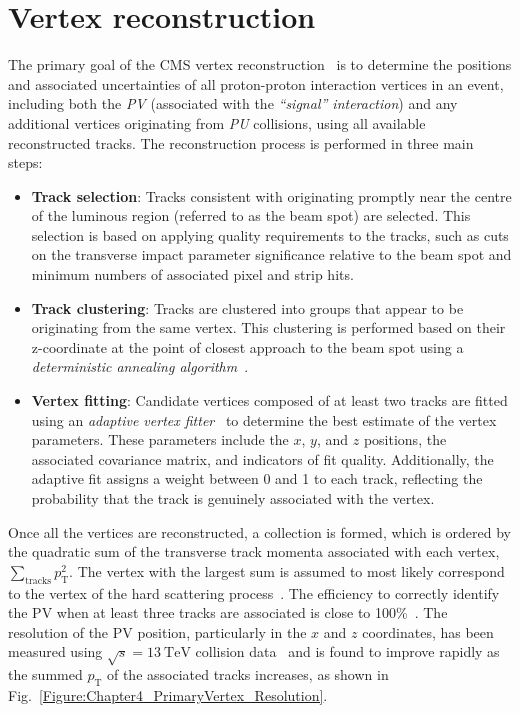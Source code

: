 \section{Vertex reconstruction}

The primary goal of the CMS vertex reconstruction~\cite{CMS_TrackerPerformance_2014} is to determine the positions and associated uncertainties of all proton-proton interaction vertices in an event, including both the \textit{\ac{PV}} (associated with the \textit{``signal'' interaction}) and any additional vertices originating from \textit{PU} collisions, using all available reconstructed tracks. The reconstruction process is performed in three main steps: 

\begin{itemize}
    \item \textbf{Track selection}: Tracks consistent with originating promptly near the centre of the luminous region (referred to as the beam spot) are selected. This selection is based on applying quality requirements to the tracks, such as cuts on the transverse impact parameter significance relative to the beam spot and minimum numbers of associated pixel and strip hits.
    \item \textbf{Track clustering}: Tracks are clustered into groups that appear to be originating from the same vertex. This clustering is performed based on their z-coordinate at the point of closest approach to the beam spot using a \textit{deterministic annealing algorithm}~\cite{DeterministicAnnealing}.
    \item \textbf{Vertex fitting}: Candidate vertices composed of at least two tracks are fitted using an \textit{adaptive vertex fitter}~\cite{VertexFitting_2006,VertexFitting_2007} to determine the best estimate of the vertex parameters. These parameters include the $x$, $y$, and $z$ positions, the associated covariance matrix, and indicators of fit quality. Additionally, the adaptive fit assigns a weight between 0 and 1 to each track, reflecting the probability that the track is genuinely associated with the vertex.
\end{itemize}

Once all the vertices are reconstructed, a collection is formed, which is ordered by the quadratic sum of the transverse track momenta associated with each vertex, $\sum_{\text{tracks}} p_{\mathrm{T}}^2$. The vertex with the largest sum is assumed to most likely correspond to the vertex of the hard scattering process~\cite{ParticleFlow}. The efficiency to correctly identify the PV when at least three tracks are associated is close to 100\%~\cite{CMS_TrackerPerformance_2014}. The resolution of the PV position, particularly in the $x$ and $z$ coordinates, has been measured using $\sqrt{s} = 13\ \mathrm{TeV}$ collision data~\cite{PrimaryVertex_Resolution} and is found to improve rapidly as the summed $p_{\mathrm{T}}$ of the associated tracks increases, as shown in Fig.~\ref{Figure:Chapter4_PrimaryVertex_Resolution}.

